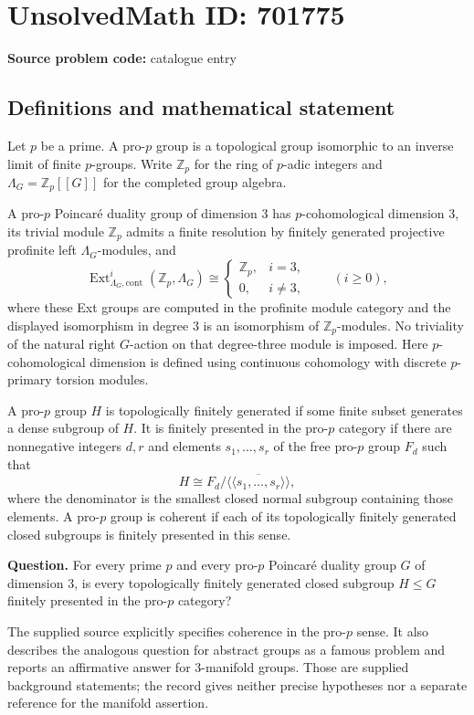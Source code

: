 \documentclass[11pt]{article}
\newcommand{\Z}{\mathbb{Z}}
\begin{document}
\section*{UnsolvedMath ID: 701775}
\textbf{Source problem code:} catalogue entry
\subsection{Definitions and mathematical statement}
Let \(p\) be a prime. A pro-\(p\) group is a topological group isomorphic to an inverse limit of finite \(p\)-groups. Write \(\Z_p\) for the ring of \(p\)-adic integers and \(\Lambda_G=\Z_p[[G]]\) for the completed group algebra.

A pro-\(p\) Poincar\'e duality group of dimension \(3\) has \(p\)-cohomological dimension \(3\), its trivial module \(\Z_p\) admits a finite resolution by finitely generated projective profinite left \(\Lambda_G\)-modules, and
\[
\operatorname{Ext}^{i}_{\Lambda_G,\mathrm{cont}}(\Z_p,\Lambda_G)
\cong
\begin{cases}
\Z_p,&i=3,\\
0,&i\ne 3,
\end{cases}
\qquad (i\geq 0),
\]
where these Ext groups are computed in the profinite module category and the displayed isomorphism in degree \(3\) is an isomorphism of \(\Z_p\)-modules. No triviality of the natural right \(G\)-action on that degree-three module is imposed. Here \(p\)-cohomological dimension is defined using continuous cohomology with discrete \(p\)-primary torsion modules.

A pro-\(p\) group \(H\) is topologically finitely generated if some finite subset generates a dense subgroup of \(H\). It is finitely presented in the pro-\(p\) category if there are nonnegative integers \(d,r\) and elements \(s_1,\ldots,s_r\) of the free pro-\(p\) group \(F_d\) such that
\[
H\cong F_d/\overline{\langle\!\langle s_1,\ldots,s_r\rangle\!\rangle},
\]
where the denominator is the smallest closed normal subgroup containing those elements. A pro-\(p\) group is coherent if each of its topologically finitely generated closed subgroups is finitely presented in this sense.

\textbf{Question.} For every prime \(p\) and every pro-\(p\) Poincar\'e duality group \(G\) of dimension \(3\), is every topologically finitely generated closed subgroup \(H\leq G\) finitely presented in the pro-\(p\) category?

The supplied source explicitly specifies coherence in the pro-\(p\) sense. It also describes the analogous question for abstract groups as a famous problem and reports an affirmative answer for \(3\)-manifold groups. Those are supplied background statements; the record gives neither precise hypotheses nor a separate reference for the manifold assertion.
\end{document}
